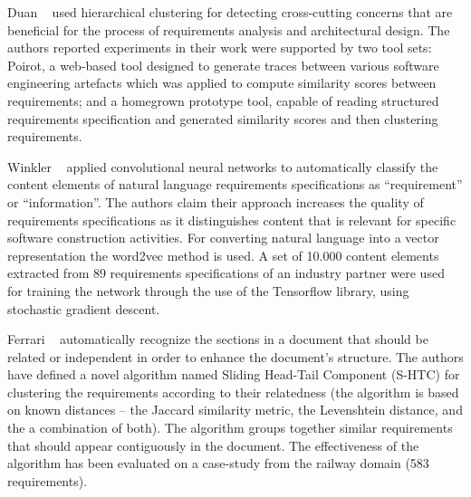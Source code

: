 Duan \etal~\cite{Duan:2007} used hierarchical clustering for
detecting cross-cutting concerns that are beneficial for the process of
requirements analysis and architectural design. The authors reported experiments
in their work were supported by two tool sets: Poirot, a
web-based tool designed to generate traces between various software engineering
artefacts which was applied to compute similarity scores between requirements;
and a homegrown prototype tool, capable of reading structured requirements
specification and generated similarity scores and then clustering requirements.

Winkler \etal~\cite{Winkler:2016} applied convolutional neural networks to
automatically classify the content elements of natural language requirements
specifications as “requirement” or “information”. The authors claim their approach increases the
quality of requirements specifications as it distinguishes content that is relevant for specific
software construction activities. For converting natural language into a vector
representation the word2vec method is used. A set of 10.000 content elements
extracted from 89 requirements specifications of an industry partner were used
for training the network through the use of the Tensorflow library, using
stochastic gradient descent.

 Ferrari \etal~\cite{Ferrari:2013} automatically recognize
the sections in a document that should be related or
independent in order to enhance the document's structure. The authors have
defined a novel algorithm named Sliding Head-Tail Component (S-HTC) for clustering the
requirements according to their relatedness (the algorithm is based on known
distances -- the Jaccard similarity metric, the Levenshtein distance, and the
a combination of both). The algorithm groups together similar
requirements that should appear contiguously in the document. The
effectiveness of the algorithm has been evaluated on a case-study from the
railway domain (583 requirements).

